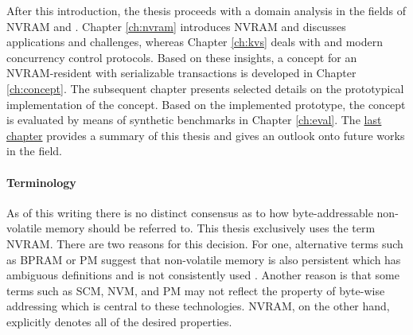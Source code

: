 After this introduction, the thesis proceeds with a domain analysis in the
fields of \ac{NVRAM} and \kvsp. Chapter \ref{ch:nvram} introduces \ac{NVRAM} and
discusses applications and challenges, whereas Chapter \ref{ch:kvs} deals with
\kvsp and modern concurrency control protocols. Based on these insights, a
concept for an NVRAM-resident \kvs with serializable transactions is developed
in Chapter \ref{ch:concept}. The subsequent chapter presents selected details on
the prototypical implementation of the concept. Based on the implemented
prototype, the concept is evaluated by means of synthetic benchmarks in Chapter
\ref{ch:eval}. The \hyperref[ch:summary]{last chapter} provides a summary of
this thesis and gives an outlook onto future works in the field.

\paragraph{Terminology}

As of this writing there is no distinct consensus as to how byte-addressable
non-volatile memory should be referred to. This thesis exclusively uses the term
\ac{NVRAM}. There are two reasons for this decision. For one, alternative terms
such as \ac{BPRAM} or \ac{PM} suggest that non-volatile memory is also
persistent which has ambiguous definitions and is not consistently used
\cite{volos2017whisper}. Another reason is that some terms such as \ac{SCM},
\ac{NVM}, and \ac{PM} may not reflect the property of byte-wise addressing which
is central to these technologies. \ac{NVRAM}, on the other hand, explicitly
denotes all of the desired properties.
